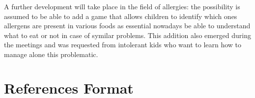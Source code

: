 \documentclass{sigchi-ext}
\begin{document}
A further development will take place in the field of allergies: the possibility is assumed to be able to add a game that allows children to identify which ones allergens are present in various foods as essential nowadays be able to understand what to eat or not in case of symilar problems. This addition also emerged during the meetings and was requested from intolerant kids who want to learn how to manage alone this problematic.

\section{References Format}


\balance{} 



\end{document}
